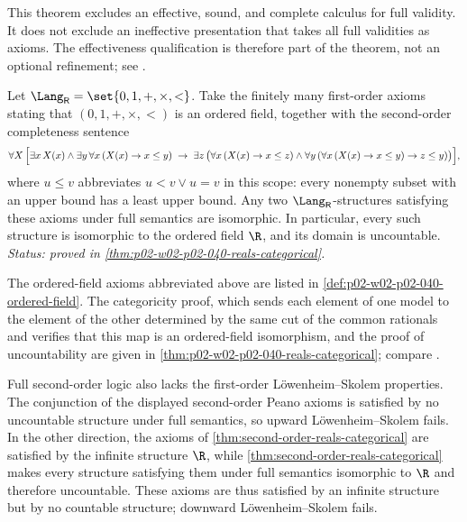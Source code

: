 This theorem excludes an effective, sound, and complete calculus for full
validity.  It does not exclude an ineffective presentation that takes all full
validities as axioms.  The effectiveness qualification is therefore part of
the theorem, not an optional refinement; see
\cite{BarwiseFeferman1985,Shapiro1991}.

\begin{theorem}
\label{thm:second-order-reals-categorical}
Let \(\Lang_{\mathsf R}=\set{0,1,+,\times,<}\).  Take the finitely many
first-order axioms stating that \((0,1,+,\times,<)\) is an ordered field,
together with the second-order completeness sentence
\[
  \forall X\,
  \Bigl[
    \exists x\,X(x)
    \land
    \exists y\,\forall x\,(X(x)\to x\le y)
    \;\to\;
    \exists z\,
    \bigl(
      \forall x\,(X(x)\to x\le z)
      \land
      \forall y\,(\forall x\,(X(x)\to x\le y)\to z\le y)
    \bigr)
  \Bigr],
\]
where \(u\le v\) abbreviates \(u<v\lor u=v\) in this scope: every nonempty
subset with an upper bound has a least upper bound.  Any two
\(\Lang_{\mathsf R}\)-structures satisfying these axioms under full
semantics are isomorphic.  In particular, every such structure is isomorphic
to the ordered field \(\R\), and its domain is uncountable.
\textit{Status: proved in \cref{thm:p02-w02-p02-040-reals-categorical}.}
\end{theorem}

The ordered-field axioms abbreviated above are listed in
\cref{def:p02-w02-p02-040-ordered-field}.  The categoricity proof, which sends
each element of one model to the element of the other determined by the same
cut of the common rationals and verifies that this map is an ordered-field
isomorphism, and the proof of uncountability are given in
\cref{thm:p02-w02-p02-040-reals-categorical}; compare \cite{Shapiro1991}.

Full second-order logic also lacks the first-order L\"owenheim--Skolem
properties.  The conjunction of the displayed second-order Peano axioms is
satisfied by no uncountable structure
under full semantics, so upward L\"owenheim--Skolem fails.  In the other
direction, the axioms of \cref{thm:second-order-reals-categorical} are
satisfied by the infinite structure \(\R\), while
\cref{thm:second-order-reals-categorical} makes every structure satisfying
them under full semantics isomorphic to \(\R\) and therefore uncountable.
These axioms are thus satisfied by an infinite structure but by no countable
structure; downward L\"owenheim--Skolem fails.

